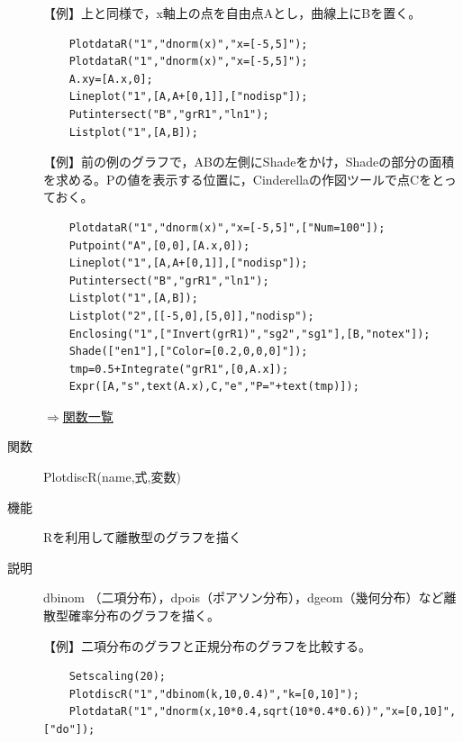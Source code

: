 \documentclass[papersize,a4paper,12pt,uplatex]{jsarticle}
\begin{document}
\begin{description}
\vspace{\baselineskip}
【例】上と同様で，x軸上の点を自由点Aとし，曲線上にBを置く。
\begin{verbatim}
    PlotdataR("1","dnorm(x)","x=[-5,5]");
    PlotdataR("1","dnorm(x)","x=[-5,5]");
    A.xy=[A.x,0];
    Lineplot("1",[A,A+[0,1]],["nodisp"]);
    Putintersect("B","grR1","ln1");
    Listplot("1",[A,B]);
\end{verbatim}
\vspace{\baselineskip}
【例】前の例のグラフで，ABの左側にShadeをかけ，Shadeの部分の面積を求める。Pの値を表示する位置に，Cinderellaの作図ツールで点Cをとっておく。
\begin{verbatim}
    PlotdataR("1","dnorm(x)","x=[-5,5]",["Num=100"]);
    Putpoint("A",[0,0],[A.x,0]);
    Lineplot("1",[A,A+[0,1]],["nodisp"]);
    Putintersect("B","grR1","ln1");
    Listplot("1",[A,B]);
    Listplot("2",[[-5,0],[5,0]],"nodisp");
    Enclosing("1",["Invert(grR1)","sg2","sg1"],[B,"notex"]);
    Shade(["en1"],["Color=[0.2,0,0,0]"]);
    tmp=0.5+Integrate("grR1",[0,A.x]);
    Expr([A,"s",text(A.x),C,"e","P="+text(tmp)]);
\end{verbatim}

    \begin{center}  \end{center}

\vspace{\baselineskip}
\begin{flushright}  \hyperlink{functionlist}{$\Rightarrow$関数一覧}\end{flushright}

\vspace{\baselineskip}
\hypertarget{plotdiscr}{}
\item[関数]  PlotdiscR(name,式,変数)
\item[機能]  Rを利用して離散型のグラフを描く
\item[説明]  dbinom （二項分布），dpois（ポアソン分布），dgeom（幾何分布）など離散型確率分布のグラフを描く。

\vspace{\baselineskip}
【例】二項分布のグラフと正規分布のグラフを比較する。
\begin{verbatim}
    Setscaling(20);
    PlotdiscR("1","dbinom(k,10,0.4)","k=[0,10]");
    PlotdataR("1","dnorm(x,10*0.4,sqrt(10*0.4*0.6))","x=[0,10]",["do"]);
\end{verbatim}
\vspace{\baselineskip}
\begin{center} \scalebox{0.9}{} \end{center}


\end{description}
\end{document}
